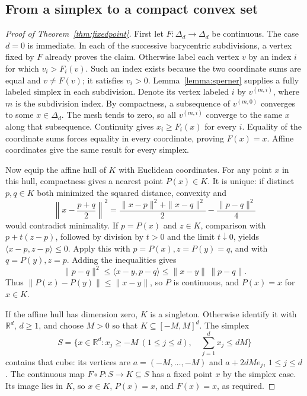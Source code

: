 \documentclass[11pt]{amsart}
\newcommand{\R}{\mathbb R}
\theoremstyle{definition}
\theoremstyle{remark}
\numberwithin{equation}{section}
\begin{document}
\subsection{From a simplex to a compact convex set}

\begin{proof}[Proof of Theorem~\ref{thm:fixedpoint}]
First let \(F:\Delta_d\to\Delta_d\) be continuous. The case
\(d=0\) is immediate. In each of the successive barycentric
subdivisions, a vertex fixed by \(F\) already proves the claim.
Otherwise label each vertex \(v\) by an index \(i\) for which
\(v_i>F_i(v)\). Such an index exists because the two coordinate
sums are equal and \(v\ne F(v)\); it satisfies \(v_i>0\).
Lemma~\ref{lemma:sperner} supplies a fully labeled simplex in each
subdivision. Denote its vertex labeled \(i\) by \(v^{(m,i)}\),
where \(m\) is the subdivision index. By compactness, a subsequence
of \(v^{(m,0)}\) converges to some \(x\in\Delta_d\).
The mesh tends to zero, so all \(v^{(m,i)}\) converge to the same
\(x\) along that subsequence. Continuity gives
\(x_i\ge F_i(x)\) for every \(i\). Equality of the coordinate
sums forces equality in every coordinate, proving \(F(x)=x\).
Affine coordinates give the same result for every simplex.

Now equip the affine hull of \(K\) with Euclidean coordinates.
For any point \(x\) in this hull, compactness gives a nearest
point \(P(x)\in K\). It is unique: if distinct \(p,q\in K\)
both minimized the squared distance, convexity and
\[
 \left\|x-\frac{p+q}{2}\right\|^2
 =\frac{\|x-p\|^2+\|x-q\|^2}{2}
  -\frac{\|p-q\|^2}{4}
\]
would contradict minimality. If \(p=P(x)\) and \(z\in K\),
comparison with \(p+t(z-p)\), followed by division by \(t>0\)
and the limit \(t\downarrow0\), yields
\(\langle x-p,z-p\rangle\le0\).
Apply this with \(p=P(x),z=P(y)=q\), and with \(q=P(y),z=p\).
Adding the inequalities gives
\[
 \|p-q\|^2\le\langle x-y,p-q\rangle
              \le\|x-y\|\,\|p-q\|.
\]
Thus \(\|P(x)-P(y)\|\le\|x-y\|\), so \(P\) is continuous,
and \(P(x)=x\) for \(x\in K\).

If the affine hull has dimension zero, \(K\) is a singleton.
Otherwise identify it with \(\R^d\), \(d\ge1\), and choose
\(M>0\) so that \(K\subseteq[-M,M]^d\). The simplex
\[
 S=\{x\in\R^d:x_j\ge-M\ (1\le j\le d),\quad
                         \sum_{j=1}^d x_j\le dM\}
\]
contains that cube: its vertices are
\(a=(-M,\ldots,-M)\) and \(a+2dM e_j\), \(1\le j\le d\).
The continuous map \(F\circ P:S\to K\subseteq S\) has a fixed
point \(x\) by the simplex case. Its image lies in \(K\), so
\(x\in K\), \(P(x)=x\), and \(F(x)=x\), as required.
\end{proof}



\end{document}
